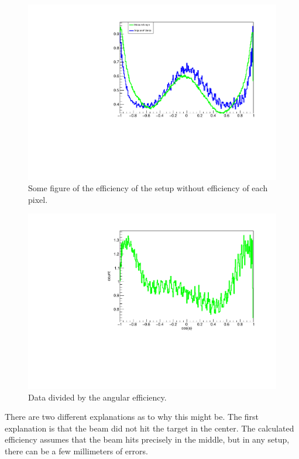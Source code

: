 \begin{figure}[h]
	\centering
	\includegraphics[width=\linewidth]{../figures/betaAngles/betaAngle.pdf}
	\caption{Some figure of the efficiency of the setup without efficiency of each pixel. }
	\label{fig:effwithweight}
\end{figure}

\begin{figure}[h]
	\centering
	\includegraphics[width=\linewidth]{../figures/betaAngles/dataDivEff.pdf}
	\caption{Data divided by the angular efficiency. }
	\label{fig:dataDivEff}
\end{figure}

There are two different explanations as to why this might be.
The first explanation is that the beam did not hit the target in the center. The calculated efficiency assumes that the beam hits precisely in the middle, but in any setup, there can be a few millimeters of errors. 

